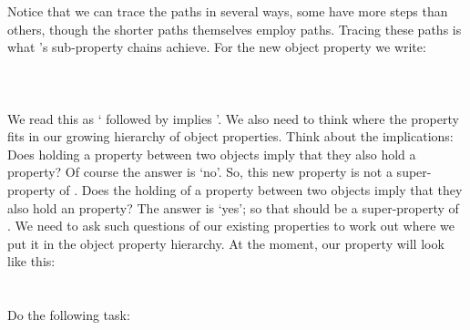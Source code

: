 Notice that we can trace the paths in several ways, some have more steps than others, though the shorter paths themselves employ paths. Tracing these paths is what \owlii's sub-property chains achieve. For the new object property  we write:
\\\\
\\\\
We read this as ` followed by  implies '.
We also need to think where the  property fits in our growing hierarchy of object properties. Think about the implications: Does holding a  property between two objects imply that they also hold a  property? Of course the answer is `no'. So, this new property is not a super-property of . Does the holding of a  property between two objects imply that they also hold an  property? The answer is `yes'; so that should be a super-property of . We need to ask such questions of our existing properties to work out where we put it in the object property hierarchy. At the moment, our  property will look like this:
\\\\
\\
Do the following task:

